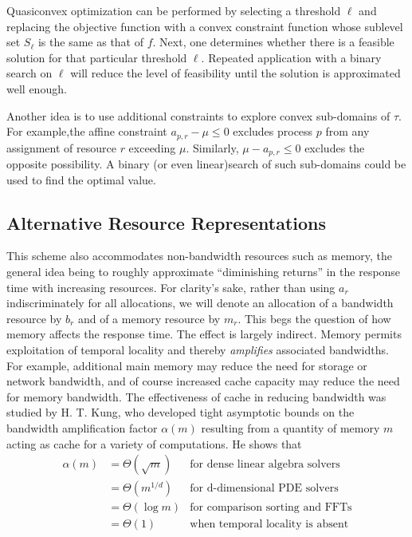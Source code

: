 Quasiconvex optimization can be performed by selecting a threshold $\ell$ and replacing the objective function
with a convex constraint function whose sublevel set $S_\ell$ is the same as that of $f$.
Next, one determines whether there is a feasible solution for that particular threshold $\ell$.
Repeated application with a binary search on $\ell$ will reduce the level of feasibility
until the solution is approximated well enough.

Another idea is to use additional constraints to explore convex sub-domains of $\tau$.
For example,the affine constraint $a_{p,r} - \mu \leq 0$ excludes process $p$ from any assignment of resource $r$ exceeding $\mu$.  Similarly, $\mu - a_{p,r} \leq 0$ excludes the opposite possibility.
A binary (or even linear)search of such sub-domains could be used to find the optimal value.

\subsection*{Alternative Resource Representations}
This scheme also accommodates non-bandwidth resources such as memory,
the general idea being to roughly approximate ``diminishing returns'' in the response time with increasing resources.
For clarity's sake, rather than using $a_r$ indiscriminately for all allocations,
we will denote an allocation of a bandwidth resource by $b_r$ and of a memory resource by $m_r$.
This begs the question of how memory affects the response time.
The effect is largely indirect.
Memory permits exploitation of temporal locality and thereby \emph{amplifies} associated bandwidths.
For example, additional main memory may reduce the need for storage or network bandwidth,
and of course increased cache capacity may reduce the need for memory bandwidth.
The effectiveness of cache in reducing bandwidth was studied by
H. T. Kung\cite{Kung}, who developed tight asymptotic bounds on the bandwidth amplification
factor $\alpha(m)$ resulting from a quantity of memory $m$ acting as cache for a variety of computations.
He shows that
\begin{displaymath}
\begin{array}{lll}
\alpha(m) &= \Theta(\sqrt m) & \mbox{for dense linear algebra solvers} \\
          &= \Theta(m^{1/d}) & \mbox{for d-dimensional PDE solvers} \\
          &= \Theta(\log m)  & \mbox{for comparison sorting and FFTs} \\
          &= \Theta(1)       & \mbox{when temporal locality is absent}
\end{array}
\end{displaymath}

